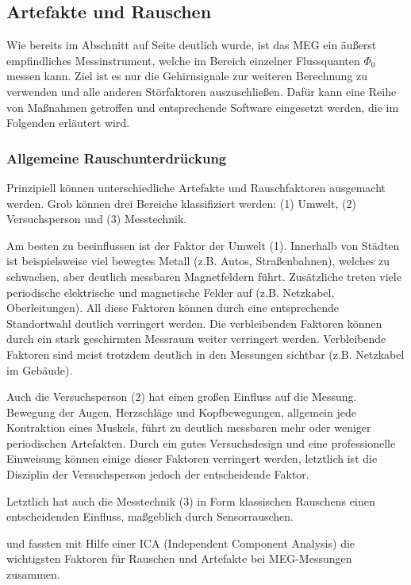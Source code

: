 \documentclass[doc,a4paper,12pt]{apa6}
\makeatletter
\DeclareRobustCommand*{\nameref}[1]{%
      \glqq{\myorg@nameref{#1}}\grqq%
    }%
\makeatother
\begin{document}
\subsection{Artefakte und Rauschen}

Wie bereits im Abschnitt \nameref{sec:squids} auf Seite \pageref{sec:squids} deutlich wurde, ist das MEG ein äußerst empfindliches Messinstrument, welche im Bereich einzelner Flussquanten $\Phi_0$ messen kann. Ziel ist es nur die Gehirnsignale zur weiteren Berechnung zu verwenden und alle anderen Störfaktoren auszuschließen. Dafür kann eine Reihe von Maßnahmen getroffen und entsprechende Software eingesetzt werden, die im Folgenden erläutert wird.

\subsubsection{Allgemeine Rauschunterdrückung}
\label{sec:rauschen}

Prinzipiell können unterschiedliche Artefakte und Rauschfaktoren ausgemacht werden. Grob können drei Bereiche klassifiziert werden: (1) Umwelt, (2) Versuchsperson und (3) Messtechnik.

Am besten zu beeinflussen ist der Faktor der Umwelt (1). Innerhalb von Städten ist beispielsweise viel bewegtes Metall (z.B. Autos, Straßenbahnen), welches zu schwachen, aber deutlich messbaren Magnetfeldern führt. Zusätzliche treten viele periodische elektrische und magnetische Felder auf (z.B. Netzkabel, Oberleitungen). All diese Faktoren können durch eine entsprechende Standortwahl deutlich verringert werden. Die verbleibenden Faktoren können durch ein stark geschirmten Messraum weiter verringert werden. Verbleibende Faktoren sind meist trotzdem deutlich in den Messungen sichtbar (z.B. Netzkabel im Gebäude).

Auch die Versuchsperson (2) hat einen großen Einfluss auf die Messung. Bewegung der Augen, Herzschläge und Kopfbewegungen, allgemein jede Kontraktion eines Muskels, führt zu deutlich messbaren mehr oder weniger periodischen Artefakten. Durch ein gutes Versuchsdesign und eine professionelle Einweisung können einige dieser Faktoren verringert werden, letztlich ist die Disziplin der Versuchsperson jedoch der entscheidende Faktor.

Letztlich hat auch die Messtechnik (3) in Form klassischen Rauschens einen entscheidenden Einfluss, maßgeblich durch Sensorrauschen.

\textcite{vigario1998independent} und \textcite{vigario2000independent} fassten mit Hilfe einer ICA (Independent Component Analysis) die wichtigsten Faktoren für Rauschen und Artefakte bei MEG-Messungen zusammen.
\end{document}
